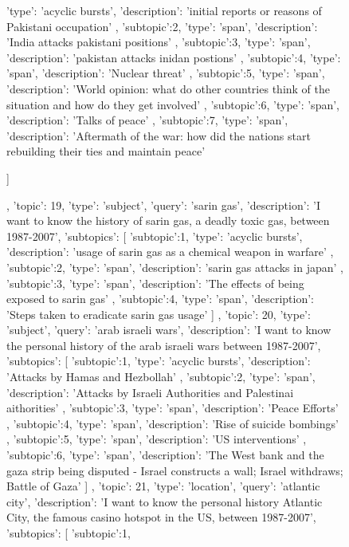 \begin{figure}[ht]
{\begin{minipage}{\textwidth}
{{				'type': 'acyclic bursts',
				'description': 'initial reports or reasons of Pakistani occupation'
			},
			{
				'subtopic':2,
				'type': 'span',
				'description': 'India attacks pakistani positions'
			},
			{
				'subtopic':3,
				'type': 'span',
				'description': 'pakistan attacks inidan postions'
			},
			{
				'subtopic':4,
				'type': 'span',
				'description': 'Nuclear threat'
			},
			{
				'subtopic':5,
				'type': 'span',
				'description': 'World opinion: what do other countries think of the situation and how do they get involved'
			},
			{
				'subtopic':6,
				'type': 'span',
				'description': 'Talks of peace'
			},
			{
				'subtopic':7,
				'type': 'span',
				'description': 'Aftermath of the war: how did the nations start rebuilding their ties and maintain peace'
			}

		]
	},
	{		
		'topic': 19,
		'type': 'subject',
		'query': 'sarin gas',
		'description': 'I want to know the history of sarin gas, a deadly toxic gas, between 1987-2007',
		'subtopics': [
			{
				'subtopic':1,
				'type': 'acyclic bursts',
				'description': 'usage of sarin gas as a chemical weapon in warfare'
			},
			{
				'subtopic':2,
				'type': 'span',
				'description': 'sarin gas attacks in japan'
			},
			{
				'subtopic':3,
				'type': 'span',
				'description': 'The effects of being exposed to sarin gas'
			},
			{
				'subtopic':4,
				'type': 'span',
				'description': 'Steps taken to eradicate sarin gas usage'
			}
		]
	},
	{		
		'topic': 20,
		'type': 'subject',
		'query': 'arab israeli wars',
		'description': 'I want to know the personal history of the arab israeli wars between 1987-2007',
		'subtopics': [
			{
				'subtopic':1,
				'type': 'acyclic bursts',
				'description': 'Attacks by Hamas and Hezbollah'
			},
			{
				'subtopic':2,
				'type': 'span',
				'description': 'Attacks by Israeli Authorities and Palestinai aithorities'
			},
			{
				'subtopic':3,
				'type': 'span',
				'description': 'Peace Efforts'
			},
			{
				'subtopic':4,
				'type': 'span',
				'description': 'Rise of suicide bombings'
			},
			{
				'subtopic':5,
				'type': 'span',
				'description': 'US interventions'
			},
			{
				'subtopic':6,
				'type': 'span',
				'description': 'The West bank and the gaza strip being disputed - Israel constructs a wall; Israel withdraws; Battle of Gaza'
			}
		]
	},
	{		
		'topic': 21,
		'type': 'location',
		'query': 'atlantic city',
		'description': 'I want to know the personal history Atlantic City, the famous casino hotspot in the US, between 1987-2007',
		'subtopics': [
			{
				'subtopic':1,
}}
\end{minipage}}
\end{figure}
